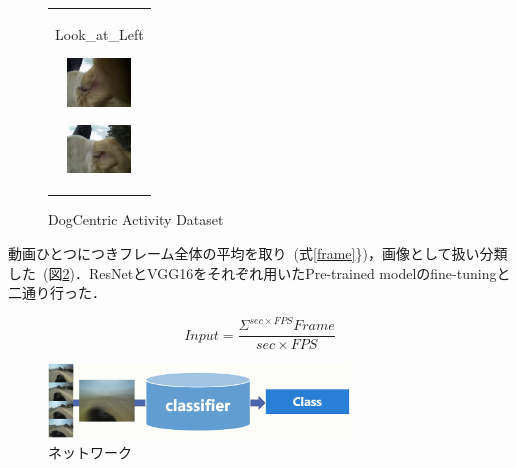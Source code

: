 \begin{figure}[htbp]
\begin{tabular}{c}
\begin{minipage}{0.18\hsize}
\begin{center}
       \hspace{0.1cm} {Look\_at\_Left} 
      \end{center}
     \end{minipage}
     \begin{minipage}{0.18\hsize}
      \begin{center}
       \includegraphics[clip, width=1.7cm]{./Img/KL004.eps}
       \hspace{1.3cm} { } 
      \end{center}
     \end{minipage}
     \begin{minipage}{0.18\hsize}
      \begin{center}
       \includegraphics[clip, width=1.7cm]{./Img/KL005.eps}
       \hspace{1.6cm} { }
      \end{center}
     \end{minipage}

    \end{tabular}
    \caption{DogCentric Activity Dataset}
    \label{dcad_img}
\end{figure}

動画ひとつにつきフレーム全体の平均を取り~(式\ref{frame}\})，画像として扱い分類した~(図\ref{net})．ResNetとVGG16をそれぞれ用いたPre-trained modelのfine-tuningと二通り行った．

\begin{equation}
 \label{frame}
 Input = \frac{\Sigma^{sec \times FPS} Frame}{sec \times FPS}
\end{equation}

\begin{figure}[htbp]
 \begin{center}
  \includegraphics[width=8cm]{./Img/net.eps}
  \caption{ネットワーク}
  \label{net}
 \end{center}
\end{figure}

